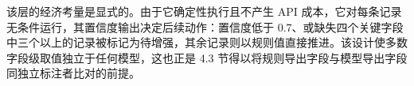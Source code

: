 \documentclass[11pt]{article}
\begin{document}
{\cjkfont 该\allowbreak 层\allowbreak 的\allowbreak 经\allowbreak 济\allowbreak 考\allowbreak 量\allowbreak 是\allowbreak 显\allowbreak 式\allowbreak 的\allowbreak 。\allowbreak 由\allowbreak 于\allowbreak 它\allowbreak 确\allowbreak 定\allowbreak 性\allowbreak 执\allowbreak 行\allowbreak 且\allowbreak 不\allowbreak 产\allowbreak 生} API {\cjkfont 成\allowbreak 本\allowbreak ，\allowbreak 它\allowbreak 对\allowbreak 每\allowbreak 条\allowbreak 记\allowbreak 录\allowbreak 无\allowbreak 条\allowbreak 件\allowbreak 运\allowbreak 行\allowbreak ，\allowbreak 其\allowbreak 置\allowbreak 信\allowbreak 度\allowbreak 输\allowbreak 出\allowbreak 决\allowbreak 定\allowbreak 后\allowbreak 续\allowbreak 动\allowbreak 作\allowbreak ：\allowbreak 置\allowbreak 信\allowbreak 度\allowbreak 低\allowbreak 于} 0.7{\cjkfont 、\allowbreak 或\allowbreak 缺\allowbreak 失\allowbreak 四\allowbreak 个\allowbreak 关\allowbreak 键\allowbreak 字\allowbreak 段\allowbreak 中\allowbreak 三\allowbreak 个\allowbreak 以\allowbreak 上\allowbreak 的\allowbreak 记\allowbreak 录\allowbreak 被\allowbreak 标\allowbreak 记\allowbreak 为\allowbreak 待\allowbreak 增\allowbreak 强\allowbreak ，\allowbreak 其\allowbreak 余\allowbreak 记\allowbreak 录\allowbreak 则\allowbreak 以\allowbreak 规\allowbreak 则\allowbreak 值\allowbreak 直\allowbreak 接\allowbreak 推\allowbreak 进\allowbreak 。\allowbreak 该\allowbreak 设\allowbreak 计\allowbreak 使\allowbreak 多\allowbreak 数\allowbreak 字\allowbreak 段\allowbreak 级\allowbreak 取\allowbreak 值\allowbreak 独\allowbreak 立\allowbreak 于\allowbreak 任\allowbreak 何\allowbreak 模\allowbreak 型\allowbreak ，\allowbreak 这\allowbreak 也\allowbreak 正\allowbreak 是} 4.3 {\cjkfont 节\allowbreak 得\allowbreak 以\allowbreak 将\allowbreak 规\allowbreak 则\allowbreak 导\allowbreak 出\allowbreak 字\allowbreak 段\allowbreak 与\allowbreak 模\allowbreak 型\allowbreak 导\allowbreak 出\allowbreak 字\allowbreak 段\allowbreak 同\allowbreak 独\allowbreak 立\allowbreak 标\allowbreak 注\allowbreak 者\allowbreak 比\allowbreak 对\allowbreak 的\allowbreak 前\allowbreak 提\allowbreak 。}
\end{document}
